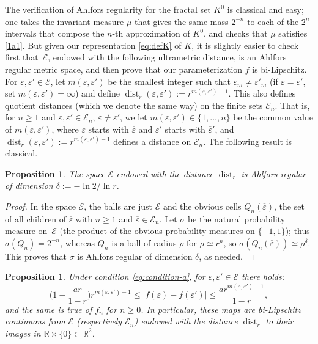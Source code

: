 \documentclass[JEP,XML,SOM,Unicode,published]{cedram}
\let\ol\overline
\numberwithin{equation}{section}
\theoremstyle{plain}
\newtheorem{pro}[lem]{Proposition}
\theoremstyle{definition}
\newcommand{\R}{\mathbb{R}}
\DeclareMathOperator{\dist}{dist}
\newcommand{\R}{\mathbb{R}}
\DeclareMathOperator{\dist}{dist}
\newcommand{\cE}{{\mathcal E}}
\begin{document}
The verification of Ahlfors regularity for the fractal set $K^0$ is classical and easy; one takes the invariant
measure $\mu$ that gives the same mass $2^{-n}$ to each of the $2^n$ intervals that compose the
$n$-th approximation of $K^0$, and checks that $\mu$ satisfies \eqref{1a1}.
But given our representation \eqref{eq:defK} of $K$, it is slightly easier to check first that~$\cE$, endowed with the following ultrametric distance, is an Ahlfors regular metric space, and then prove
that our parameterization $f$ is bi-Lipschitz.
For $\varepsilon, \varepsilon' \in \cE$,
let $m(\varepsilon,\varepsilon')$ be the smallest integer such that $\varepsilon_m\neq \varepsilon'_m$
(if $\varepsilon = \varepsilon'$, set $m(\varepsilon,\varepsilon')=\infty$) and define
$\dist_r(\varepsilon,\varepsilon'):= r^{m(\varepsilon,\varepsilon')-1}$.
This also defines quotient distances (which we denote the same way) on the finite sets $\cE_n$.
That is, for $n \geq 1$ and $\ol\varepsilon,\ol\varepsilon'\in \cE_n$, $\ol\varepsilon \neq\ol\varepsilon'$,
we let $m(\ol\varepsilon,\ol\varepsilon') \in \{1,\dots,n\}$ be the common value of $m(\varepsilon,\varepsilon')$,
where $\varepsilon$ starts with $\ol\varepsilon$ and $\varepsilon'$ starts with $\ol\varepsilon'$, and
$\dist_r(\varepsilon,\varepsilon'):= r^{m(\varepsilon,\varepsilon')-1}$ defines a distance on $\cE_n$.
The following result is classical.

\begin{pro}\label{pro:AR}
The space $\cE$ endowed with the distance $\dist_r$ is Ahlfors regular of dimension $\delta :=-\ln 2/\ln r$.
\end{pro}

\begin{proof}
In the space $\cE$, the balls are just $\cE$ and the obvious cells $Q_n(\ol \varepsilon)$, \ie the set of all children of $\ol\varepsilon$ with $n \geq 1$ and
$\ol\varepsilon \in \cE_n$. Let $\sigma$ be the natural probability measure on~$\cE$
(the product of the obvious probability measures on $\{ -1, 1 \}$); thus $\sigma(Q_n) = 2^{-n}$,
whereas $Q_n$ is a ball of radius $\rho$ for $\rho \simeq r^n$, so $\sigma(Q_n(\ol \varepsilon)) \simeq \rho^\delta$.
This proves that $\sigma$ is Ahlfors regular of dimension $\delta$, as needed.
\end{proof}

\begin{pro}\label{pro:bilip}
Under condition \eqref{eq:condition-a}, for $\varepsilon, \varepsilon' \in \cE$
there holds:
\begin{equation}\label{eq:bilip-N}
\Big (1- \dfrac{ar}{1-r}\Big )r^{m(\varepsilon,\varepsilon')-1} \le |f(\varepsilon)-f(\varepsilon')| \le \dfrac{a r^{m(\varepsilon,\varepsilon')-1}}{1-r},
\end{equation}
and the same is true of $f_n$ for $n\ge 0$. In particular, these maps are bi-Lipschitz continuous from $\cE$
(respectively $\cE_{n}$) endowed with the distance $\dist_r$ to their images in $\R\times \{0\} \subset \R^2$.
\end{pro}
\end{document}
